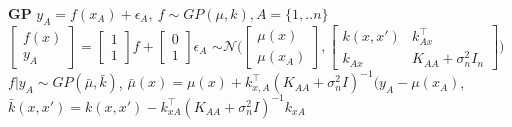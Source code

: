 \textbf{GP}
$y_{A}=f(x_{A})+\epsilon_{A},\ f\sim GP(\mu, k), A=\{1,..n\}$
$\begin{bmatrix} f(x) \\ y_{A}\end{bmatrix} = \begin{bmatrix} 1 \\ 1\end{bmatrix} f + \begin{bmatrix} 0 \\ 1 \end{bmatrix}\epsilon_{A}$
$\sim \mathcal{N}\big( \begin{bmatrix} \mu(x) \\ \mu(x_{A})\end{bmatrix},
    \begin{bmatrix} k(x,x') & k_{Ax}^{\top} \\ k_{Ax} & K_{AA}+\sigma_{n}^{2}I_{n}\end{bmatrix} \big)$
$f|y_{A} \sim GP(\bar{\mu}, \bar{k})$,
$\bar{\mu}(x) = \mu(x) + k_{x,A}^{\top}(K_{AA}+\sigma_{n}^{2}I)^{-1}(y_{A}-\mu(x_{A})$,
$\bar{k}(x,x')= k(x,x')-k_{xA}^{\top}(K_{AA}+\sigma_{n}^{2}I)^{-1}k_{xA}$\\


